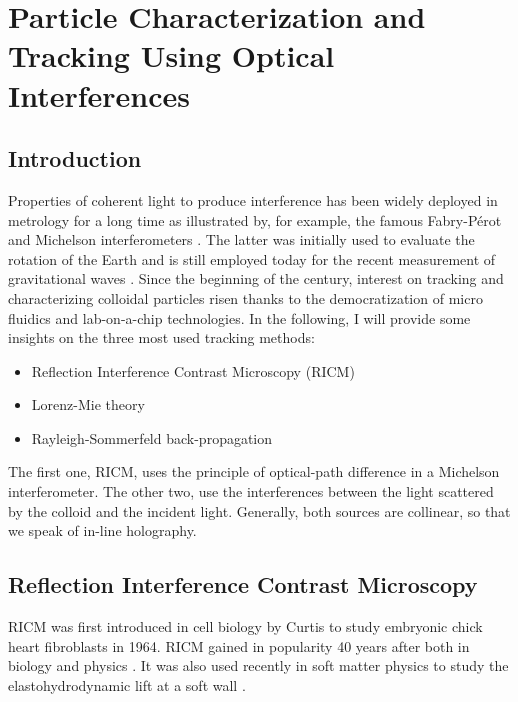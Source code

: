 \newpage
\section{Particle Characterization and Tracking Using Optical Interferences}
\label{sec:chapter2}

\subsection{Introduction}

Properties of coherent light to produce interference has been widely deployed in metrology for a long time as illustrated by, for example, the famous Fabry-Pérot  \cite{fabry_theorie_1899, perot_application_1899} and Michelson interferometers \cite{michelson_relative_1887}. The latter was initially used to evaluate the rotation of the Earth and is still employed today for the recent measurement of gravitational waves
\cite{ligo_scientific_collaboration_and_virgo_collaboration_gw151226_2016}. 
Since the beginning of the century, interest on tracking and characterizing colloidal particles risen thanks to the democratization of micro fluidics and lab-on-a-chip technologies. In the following, I will provide some insights on the three most used tracking methods:

\begin{itemize}
	\item Reflection Interference Contrast Microscopy (\gls{RICM})
	\item Lorenz-Mie theory
	\item Rayleigh-Sommerfeld back-propagation
\end{itemize}

The first one, \gls{RICM}, uses the principle of optical-path difference in a Michelson interferometer. The other two, use the interferences between the light scattered by the colloid and the incident light. Generally, both sources are collinear, so that we speak of in-line holography. 



\subsection{Reflection Interference Contrast Microscopy}




\gls{RICM} was first introduced in cell biology by Curtis to study embryonic chick heart fibroblasts \cite{curtis_mechanism_1964} in 1964. \gls{RICM} gained in popularity 40 years after both in biology and physics \cite{filler_reflection_2000, siver_use_2000, weber_2_2003, limozin_quantitative_2009, nadal_probing_2002, raedler_measurement_1992}. It was also used recently in soft matter physics to study the elastohydrodynamic lift at a soft wall \cite{davies_elastohydrodynamic_2018}.

